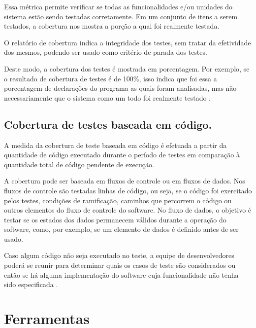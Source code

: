 \par Essa métrica permite verificar se todas as funcionalidades e/ou unidades do sistema estão sendo testadas corretamente. Em um conjunto de itens a serem testados, a cobertura nos mostra a porção a qual foi realmente testada.

\par O relatório de cobertura indica a integridade dos testes, sem tratar da efetividade dos mesmos, podendo ser usado como critério de parada dos testes.

\par Deste modo, a cobertura dos testes é mostrada em porcentagem. Por exemplo, se o resultado de cobertura de testes é de 100\%, isso indica que foi essa a porcentagem de declarações do programa as quais foram analisadas, mas não necessariamente que o sistema como um todo foi realmente testado \cite{relatorio}.

 \subsection{Cobertura de testes baseada em código.}

 \par A medida da cobertura de teste baseada em código é efetuada a partir da quantidade de código executado durante o período de testes em comparação à quantidade total de código pendente de execução.

\par A cobertura pode ser baseada em fluxos de controle ou em fluxos de dados. Nos fluxos de controle são testadas linhas de código, ou seja, se o código foi exercitado pelos testes, condições de ramificação, caminhos que percorrem o código ou outros elementos do fluxo de controle do software. No fluxo de dados, o objetivo é testar se os estados dos dados permanecem válidos durante a operação do software, como, por exemplo, se um elemento de dados é definido antes de ser usado.

\par Caso algum código não seja executado no teste, a equipe de desenvolvedores poderá se reunir para determinar quais os casos de teste são considerados ou então se há alguma implementação do software cuja funcionalidade não tenha sido especificada \cite{relatorio}.

\section{Ferramentas}

